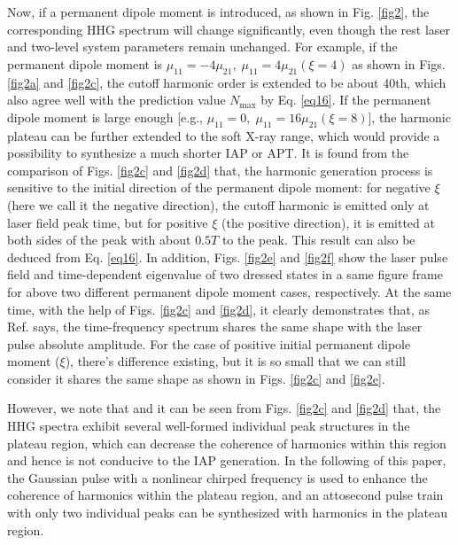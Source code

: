 \documentclass[10pt,letterpaper]{article}
\begin{document}
Now, if a permanent dipole moment is introduced, as shown in Fig. \ref{fig2}, the corresponding HHG spectrum will change significantly, even though the rest laser and two-level system parameters remain unchanged. For example, if the permanent dipole moment is $\mu_{11} =-4\mu_{21},\;\mu_{11} =4\mu_{21}(\xi=4)$ as shown in Figs. \ref{fig2a} and \ref{fig2c}, the cutoff harmonic order is extended to be about 40th, which also agree well with the prediction value $N_\textrm{max}$ by Eq. \ref{eq16}. If the permanent dipole moment is large enough [e.g., $\mu_{11} =0,\;\mu_{11} =16\mu_{21}(\xi=8)$], the harmonic plateau can  be further extended to the soft X-ray range, which would provide a possibility to synthesize a much shorter IAP or APT. It is found from the comparison of Figs. \ref{fig2c} and \ref{fig2d} that, the harmonic generation process is sensitive to the initial direction of the permanent dipole moment: for negative $\xi$ (here we call it the negative direction), the cutoff harmonic is emitted only at laser field peak time, but for positive $\xi$ (the positive direction), it is emitted at both sides of the peak with about $0.5T$ to the peak. This result can also be deduced from Eq. \ref{eq16}. In addition, Figs. \ref{fig2e} and \ref{fig2f} show the laser pulse field and time-dependent eigenvalue of two dressed states in a same figure frame for above two different permanent dipole moment cases, respectively. At the same time, with the help of Figs. \ref{fig2c} and \ref{fig2d}, it clearly demonstrates that, as Ref. \cite{CuiNi2010NJP-wavelet} says, the time-frequency spectrum shares the same shape with the laser pulse absolute amplitude. For the case of positive initial permanent dipole moment ($\xi$), there's difference existing, but it is so small that we can still consider it shares the same shape as shown in Figs. \ref{fig2c} and \ref{fig2e}.      

However, we note that and it can be seen from Figs. \ref{fig2c} and \ref{fig2d} that, the HHG spectra exhibit several well-formed individual peak structures in the plateau region, which can decrease the coherence of harmonics within this region and hence is not conducive to the IAP generation. In the following of this paper, the Gaussian pulse with a nonlinear chirped frequency is used to enhance the coherence of harmonics within the plateau region, and an attosecond pulse train with only two individual peaks can be synthesized with harmonics in the plateau region.
\end{document}
